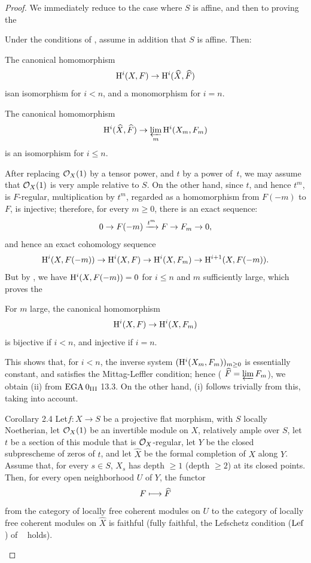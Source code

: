 \begin{proof}
We immediately reduce to the case where $S$ is affine, and then to proving the

\begin{corollaire} \label{XII.2.2}
Under the conditions of , assume in addition that $S$ is affine. Then:
\begin{enumeratei}
\item
The canonical homomorphism
\[
\mathrm H^i(X, F) \to \mathrm H^i(\widehat{X}, \widehat{F})
\]
is\pageoriginale an isomorphism for $i<n$, and a monomorphism for $i=n$.
\item
The canonical homomorphism
\[
\mathrm H^i(\widehat{X}, \widehat{F}) \to \varprojlim_m \mathrm H^i(X_m, F_m)
\]
is an isomorphism for $i\leq n$.
\end{enumeratei}
\end{corollaire}

After replacing $\mathcal O_X(1)$ by a tensor power, and $t$ by a power of~$t$, we may assume that $\mathcal O_X(1)$ is very ample relative to $S$. On the other hand, since $t$, and hence $t^m$, is $F$-regular, multiplication by $t^m$, regarded as a homomorphism from $F(-m)$ to $F$, is injective; therefore, for every $m\geq 0$, there is an exact sequence:
\steco
\begin{equation} \label{eq:XII.14}
0\to F(-m) \xrightarrow{t^m} F \to F_m \to0,
\end{equation}
and hence an exact cohomology sequence
\[
\mathrm H^i(X, F(-m)) \to \mathrm H^i(X, F) \to \mathrm H^i(X, F_m) \to \mathrm H^{i+1}(X, F(-m)).
\]
But by , we have $\mathrm H^i(X, F(-m))=0$ for $i\leq n$ and $m$ sufficiently large, which proves the

\begin{lemme} \label{XII.2.3}
For $m$ large, the canonical homomorphism
\[
\mathrm H^i(X, F) \to \mathrm H^i(X, F_m)
\]
is bijective if $i<n$, and injective if $i=n$.
\end{lemme}

\enlargethispage{-2\baselineskip}%
This shows that, for $i<n$, the inverse system $(\mathrm H^i(X_m, F_m))_{m\geq 0}$ is essentially constant, and \afortiori satisfies the Mittag-Leffler condition; hence ( $\widehat{F}= \varprojlim F_m$), we obtain (ii) from $\textup{EGA}\kern.2em 0_{\textup{III}}$ 13.3. On the other hand, (i) follows trivially from this, taking  into account.

\label{XII.2.4}
\begin{enonce*}{Corollary 2.4}
Let\pageoriginale $f:X\to S$ be a projective flat morphism, with $S$ locally Noetherian, let $\mathcal O_X(1)$ be an invertible module on $X$, relatively ample over $S$, let $t$ be a section of this module that is $\mathcal O_X$-regular, let $Y$ be the closed subprescheme of zeros of $t$, and let $\widehat{X}$ be the formal completion of $X$ along $Y$. Assume that, for every $s\in S$, $X_s$ has depth $\geq 1$ (\resp depth $\geq 2$) at its closed points. Then, for every open neighborhood $U$ of $Y$, the functor
\[
F \longmapsto \widehat{F}
\]
from the category of locally free coherent modules on $U$ to the category of locally free coherent modules on $\widehat{X}$ is faithful (\resp fully faithful, \ie the Lefschetz condition ($\operatorname{Lef}$) of ~ holds).
\end{enonce*}


\end{proof}
